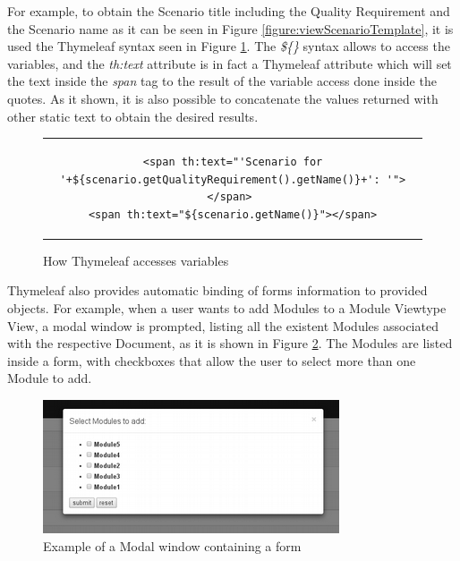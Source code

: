 For example, to obtain the Scenario title including the Quality Requirement and the Scenario name as it can be seen in Figure \ref{figure:viewScenarioTemplate}, it is used the Thymeleaf syntax seen in Figure \ref{figure:viewsCallingMethods}. The \textit{\$\{\}} syntax allows to access the variables, and the \textit{th:text} attribute is in fact a Thymeleaf attribute which will set the text inside the \textit{span} tag to the result of the variable access done inside the quotes. As it shown, it is also possible to concatenate the values returned with other static text to obtain the desired results.
\begin{figure}[h]
\centering
\lstset{style=customhtml}
\begin{tabular}{c}
\begin{lstlisting}
<span th:text="'Scenario for '+${scenario.getQualityRequirement().getName()}+': '">
</span> 
<span th:text="${scenario.getName()}"></span>
\end{lstlisting}
\end{tabular}
\caption{How Thymeleaf accesses variables}
\label{figure:viewsCallingMethods}
\end{figure}

Thymeleaf also provides automatic binding of forms information to provided objects. For example, when a user wants to add Modules to a Module Viewtype View, a modal window is prompted, listing all the existent Modules associated with the respective Document, as it is shown in Figure \ref{figure:viewsModalFormExample}. The Modules are listed inside a form, with checkboxes that allow the user to select more than one Module to add. 

\begin{figure}[h]
\centering
\includegraphics{images/modalExample}
\caption{Example of a Modal window containing a form}
\label{figure:viewsModalFormExample}
\end{figure}


